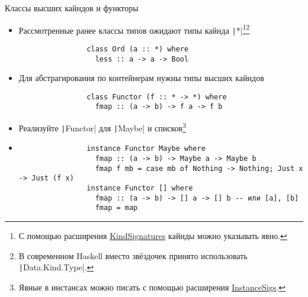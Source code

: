 
    \begin{frame}[fragile]{Классы высших кайндов и функторы}
        \begin{itemize}
            \item Рассмотренные ранее классы типов ожидают типы кайнда \texttt|*|\footnote{С помощью расширения \href{https://ghc.gitlab.haskell.org/ghc/doc/users_guide/exts/kind_signatures.html}{\color{blue}KindSignatures} кайнды можно указывать явно.}\footnote{В современном Haskell вместо звёздочек принято использовать \texttt|Data.Kind.Type|.}
            \begin{verbatim}
                class Ord (a :: *) where
                  less :: a -> a -> Bool
            \end{verbatim}
            \item Для абстрагирования по контейнерам нужны типы высших кайндов
            \begin{verbatim}
                class Functor (f :: * -> *) where
                  fmap :: (a -> b) -> f a -> f b
            \end{verbatim}
            \item[\todo] Реализуйте \texttt|Functor| для \texttt|Maybe| и списков\footnote{Явные в инстансах можно писать с помощью расширения \href{https://downloads.haskell.org/ghc/latest/docs/users_guide/exts/instances.html\#extension-InstanceSigs}{\color{blue}InstanceSigs}.}
            \item[\answer] \pause
            \begin{verbatim}
                instance Functor Maybe where
                  fmap :: (a -> b) -> Maybe a -> Maybe b
                  fmap f mb = case mb of Nothing -> Nothing; Just x -> Just (f x)
                instance Functor [] where
                  fmap :: (a -> b) -> [] a -> [] b -- или [a], [b]
                  fmap = map
            \end{verbatim}
        \end{itemize}
    \end{frame}

